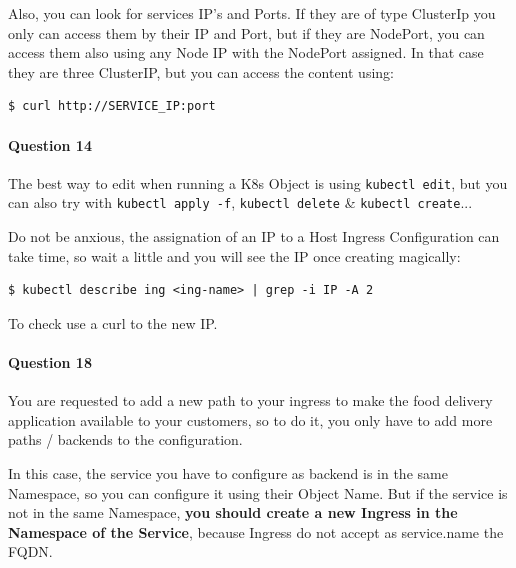 \documentclass{article}
\newenvironment{blocktemplateII}[1]{%
    \tcolorbox[beamer,%
    noparskip,breakable,
    colframe=Green,%
    colbacklower=LimeGreen!75!LightGreen,%
    title=#1]}%
    {\endtcolorbox}
\newenvironment{blocktemplateIII}[1]{%
    \tcolorbox[beamer,%
    noparskip,breakable,
    ,colframe=Red,%
    colbacklower=LimeGreen!75!LightGreen,%
    title=#1]}%
    {\endtcolorbox}
\newenvironment{codetemplate}[1][]{%
  \mybasecolorbox[#1]
  \itshape
}{%
  \endmybasecolorbox
}
\begin{document}
Also, you can look for services IP's and Ports. If they are of type ClusterIp you only can access them by their IP and Port, but if they are NodePort, you can access them also using any Node IP with the NodePort assigned. In that case they are three ClusterIP, but you can access the content using:

\begin{codetemplate}{}
\begin{verbatim}
$ curl http://SERVICE_IP:port
\end{verbatim}
\end{codetemplate}

\paragraph{Question 14}

The best way to edit when running a K8s Object is using \verb|kubectl edit|, but you can also try with \verb|kubectl apply -f|, \verb|kubectl delete| \& \verb|kubectl create|...

\begin{blocktemplateII}{NOTE}
Do not be anxious, the assignation of an IP to a Host Ingress Configuration can take time, so wait a little and you will see the IP once creating magically:
\begin{codetemplate}{}
\begin{verbatim}
$ kubectl describe ing <ing-name> | grep -i IP -A 2
\end{verbatim}
\end{codetemplate}
\end{blocktemplateII}

To check use a curl to the new IP.

\paragraph{Question 18}

You are requested to add a new path to your ingress to make the food delivery application available to your customers, so to do it, you only have to add more paths / backends to the configuration.

\begin{blocktemplateIII}{WARNING}
In this case, the service you have to configure as backend is in the same Namespace, so you can configure it using their Object Name. But if the service is not in the same Namespace, \textbf{you should create a new Ingress in the Namespace of the Service}, because Ingress do not accept as service.name the FQDN.
\end{blocktemplateIII}
\end{document}
